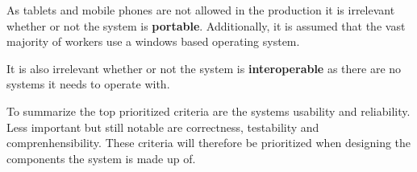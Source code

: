 As tablets and mobile phones are not allowed in the production it is irrelevant whether or not the system is \textbf{portable}.
Additionally, it is assumed that the vast majority of workers use a windows based operating system.

It is also irrelevant whether or not the system is \textbf{interoperable} as there are no systems it needs to operate with.

To summarize the top prioritized criteria are the systems usability and reliability. 
Less important but still notable are correctness, testability and comprenhensibility. 
These criteria will therefore be prioritized when designing the components the system is made up of.
